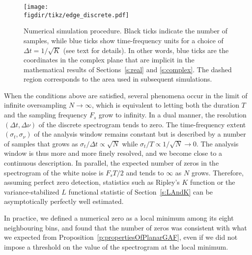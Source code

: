 \begin{figure}
	\centering 
	\texttt{[image: \\figdir/tikz/edge\_discrete.pdf]}\caption{Numerical
    simulation procedure. Black ticks indicate the number of samples, while blue
    ticks show time-frequency units for a choice of $\Delta t = 1/\sqrt{K}$ (see
    text for details). In other words, blue ticks are the coordinates in the
    complex plane that are implicit in the mathematical results of
    Sections~\ref{s:real} and \ref{s:complex}. The dashed region corresponds to the area used in subsequent simulations.}\label{fig:edge_effects}
\end{figure}

When the conditions above are satisfied, several phenomena occur in the limit of
infinite oversampling $N\to\infty$, which is equivalent to letting both the
duration $T$ and the sampling
frequency $F_s$ grow to infinity. In a dual manner, the resolution $(\Delta t, \Delta \nu)$ of the
discrete spectrogram tends to zero. The time-frequency extent $(\sigma_t, \sigma_\nu)$ of
the analysis window remains constant but is described by a number of samples that grows as $\sigma_t/\Delta t \propto\sqrt{N}$ while $\sigma_t/T\propto 1/\sqrt{N}\to 0$. The analysis window is thus more and more finely resolved, and
we become close to a continuous description.
In parallel, the expected number of zeros in the spectrogram of the white noise is $F_sT/2$ and
tends to $\infty$ as $N$ grows. Therefore, assuming perfect zero detection, statistics such as Ripley's $K$ function
or the variance-stabilized $L$ functional statistic of Section~\ref{s:LAndK} can
be asymptotically perfectly well estimated. 

In practice, we defined a numerical
zero as a local minimum among its eight neighbouring bins, and found that the
number of zeros was consistent with what we expected from
Proposition~\ref{p:propertiesOfPlanarGAF}, even if we did not impose a threshold
on the value of the spectrogram at the local minimum. 

